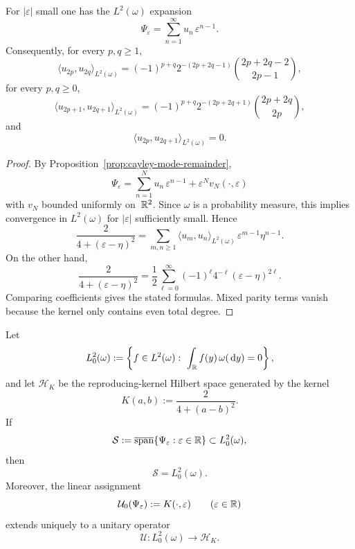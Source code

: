 \begin{corollary}%
\label{cor:mode-quadratic-integrals}
For $|\varepsilon|$ small one has the $L^2(\omega)$ expansion
\[
\Psi_\varepsilon
=\sum_{n=1}^{\infty}u_n\,\varepsilon^{n-1}.
\]
Consequently, for every $p,q\ge 1$,
\[
\langle u_{2p},u_{2q}\rangle_{L^2(\omega)}
=(-1)^{p+q}2^{-(2p+2q-1)}
\binom{2p+2q-2}{2p-1},
\]
for every $p,q\ge 0$,
\[
\langle u_{2p+1},u_{2q+1}\rangle_{L^2(\omega)}
=(-1)^{p+q}2^{-(2p+2q+1)}
\binom{2p+2q}{2p},
\]
and
\[
\langle u_{2p},u_{2q+1}\rangle_{L^2(\omega)}=0.
\]
\end{corollary}

\begin{proof}
By Proposition~\ref{prop:cayley-mode-remainder},
\[
\Psi_\varepsilon
=\sum_{n=1}^{N}u_n\,\varepsilon^{n-1}
+\varepsilon^N v_N(\cdot,\varepsilon)
\]
with $v_N$ bounded uniformly on~$\mathbb{R}^2$.  Since $\omega$ is a probability
measure, this implies convergence in $L^2(\omega)$ for $|\varepsilon|$
sufficiently small.  Hence
\[
\frac{2}{4+(\varepsilon-\eta)^2}
=\sum_{m,n\ge 1}
\langle u_m,u_n\rangle_{L^2(\omega)}\,
\varepsilon^{m-1}\eta^{n-1}.
\]
On the other hand,
\[
\frac{2}{4+(\varepsilon-\eta)^2}
=\frac12\sum_{\ell=0}^{\infty}
(-1)^\ell 4^{-\ell}(\varepsilon-\eta)^{2\ell}.
\]
Comparing coefficients gives the stated formulas.  Mixed parity terms
vanish because the kernel only contains even total degree.
\end{proof}

\begin{theorem}%
\label{thm:mode-space-rkhs}
Let
\[
L^2_0(\omega):=
\left\{
f\in L^2(\omega):\ \int_{\mathbb{R}}f(y)\,\omega(\,\mathrm{d} y)=0
\right\},
\]
and let $\mathcal H_K$ be the reproducing-kernel Hilbert space generated
by the kernel
\[
K(a,b):=\frac{2}{4+(a-b)^2}.
\]
If
\[
\mathcal S:=\overline{\operatorname{span}}\{\Psi_\varepsilon:\varepsilon\in\mathbb{R}\}
\subset L^2_0(\omega),
\]
then
\[
\mathcal S=L^2_0(\omega).
\]
Moreover, the linear assignment
\[
\mathcal U_0(\Psi_\varepsilon):=K(\cdot,\varepsilon)
\qquad(\varepsilon\in\mathbb{R})
\]
extends uniquely to a unitary operator
\[
\mathcal U:L^2_0(\omega)\longrightarrow \mathcal H_K.
\]
\end{theorem}

